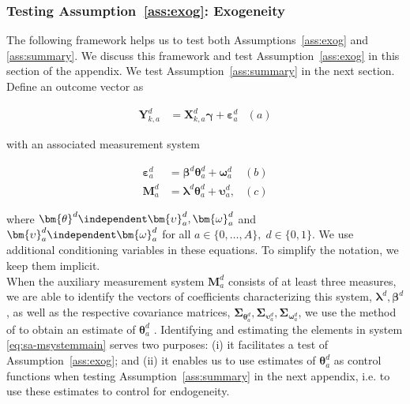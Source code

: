 \subsubsection{Testing Assumption~\ref{ass:exog}: Exogeneity} \label{app:endogeneity}

\noindent The following framework helps us to test both Assumptions~\ref{ass:exog} and \ref{ass:summary}. We discuss this framework and test Assumption~\ref{ass:exog} in this section of the appendix. We test Assumption~\ref{ass:summary} in the next section.\\

\noindent Define an outcome vector as

\begin{align}
\bm{Y}^d_{k,a} &= \bm{X}^d_{k,a} \bm{\gamma} + \bm{\varepsilon}^d_a  &(a) \nonumber
\end{align}

\noindent with an associated measurement system

\begin{align}  \label{eq:sa-msystemmain}
\bm{\varepsilon}_{a}^d &=\bm{\beta}^d \bm{\theta}_{a}^d + \bm{\omega}_{a}^d  &(b) \nonumber \\
\bm{M}_{a}^d &= \bm{\lambda}^d \bm{\theta}_{a}^d + \bm{\upsilon}_a^d,  &(c)
\end{align}


\noindent where $\bm{\theta}^d \independent \bm{\upsilon}_{a}^d, \bm{\omega}_{a}^d$ and $\bm{\upsilon}_{a}^d \independent \bm{\omega}_{a}^d$ for all $a \in \{0, \ldots, A \}, \; d \in \{0,1\}$. We use additional conditioning variables in these equations. To simplify the notation, we keep them implicit.\\

\noindent When the auxiliary measurement system $\bm{M}_{a}^d $ consists of at least three measures, we are able to identify the vectors of coefficients characterizing this system, $\bm{\lambda}^d, \bm{\beta}^d$, as well as the respective covariance matrices, $\bm{\Sigma}_{\bm{\theta}_{a}^d}, \bm{\Sigma}_{\bm{\upsilon}_{a}^d}, \bm{\Sigma}_{\bm{\omega}_{a}^d}$, we use the method of \citet{Bartlett_1938_Nature} to obtain an estimate of $\bm{\theta}_{a}^d$ \citep{Heckman_Pinto_etal_2013_PerryFactor}. Identifying and estimating the elements in system \eqref{eq:sa-msystemmain} serves two purposes: (i) it facilitates a test of Assumption~\ref{ass:exog}; and (ii) it enables us to use estimates of $\bm{\theta}_{a}^d$ as control functions when testing Assumption~\ref{ass:summary} in the next appendix, i.e. to use these estimates to control for endogeneity.\\

